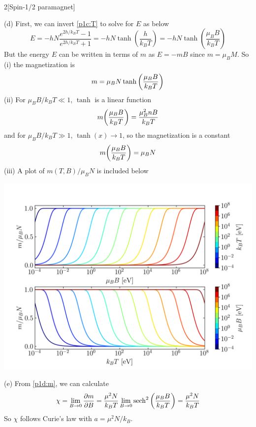 \documentclass[12pt]{article}
\begin{document}
\begin{problem}{2}[Spin-1/2 paramagnet]
\begin{solution}
(d) First, we can invert \eqref{p1c:T} to solve for $E$ as below
\begin{equation}
    E=-hN\frac{e^{2h/k_BT}-1}{e^{2h/k_BT}+1}=-hN\tanh(\frac{h}{k_BT})
    =-hN\tanh(\frac{\mu_BB}{k_BT})
\end{equation}
But the energy $E$ can be written in terms of $m$ as $E=-mB$ since $m=\mu_BM$.
So (i) the magnetization is
\begin{equation}\label{p1d:m}
    m=\mu_BN\tanh\qty(\frac{\mu_BB}{k_BT}) 
\end{equation}
(ii) For $\mu_BB/k_BT\ll 1$, $\tanh$ is a linear function
\begin{equation}
    m\qty(\frac{\mu_BB}{k_BT})=\frac{\mu_B^2nB}{k_BT} 
\end{equation}
and for $\mu_BB/k_BT\gg 1$, $\tanh(x)\to 1$, so the magnetization is a constant
\begin{equation}
    m\qty(\frac{\mu_BB}{k_BT})=\mu_BN 
\end{equation}
(iii) A plot of $m(T,B)/\mu_BN$ is included below
\begin{center}
    \includegraphics[width=\textwidth]{p1d.png} 
\end{center}

(e) From \eqref{p1d:m}, we can calculate
\begin{equation}
    \chi=\lim_{B\to0}\frac{\partial m}{\partial B}
    =\frac{\mu^2N}{k_BT}\lim_{B\to0}\sech^2\qty(\frac{\mu_BB}{k_BT})
    =\frac{\mu^2N}{k_BT}
\end{equation}
So $\chi$ follows Curie's law with $a=\mu^2N/k_B$.


\end{solution}
\end{problem}
\end{document}
